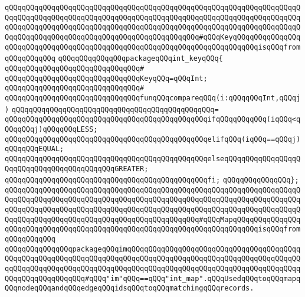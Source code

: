 \verb|qQQqqQQqqQQqqQQqqQQqqQQqqQQqqQQqqQQqqQQqqQQqqQQqqQQqqQQqqQQqqQQqqQQqqQQqqQQqqQQqqQQqqQQqqQQqqQQqqQQqqQQqqQQqqQQqqQQqqQQqqQQqqQQqqQQqqQQqqQQqqQQqqQQqqQQqqQQqqQQqqQQqqQQqqQQqqQQqqQQqqQQqqQQqqQQqqQQqqQQqqQQqqQQqqQQqqQQqqQQqqQQqqQQqqQQqqQQqqQQqqQQqqQQqqQQqqQQq#qQQqKeyqQQqqQQqqQQqqQQqqQQqqQQqqQQqqQQqqQQqqQQqqQQqqQQqqQQqqQQqqQQqqQQqqQQqqQQqqQQqisqQQqfromqQQqqQQqqQQq|\newline
\verb|qQQqqQQqqQQqqQQqpackageqQQqint_keyqQQq{|\newline
\verb|qQQqqQQqqQQqqQQqqQQqqQQqqQQqqQQq#|\newline
\verb|qQQqqQQqqQQqqQQqqQQqqQQqqQQqqQQqKeyqQQq=qQQqInt;|\newline
\verb|qQQqqQQqqQQqqQQqqQQqqQQqqQQqqQQq#|\newline
\verb|qQQqqQQqqQQqqQQqqQQqqQQqqQQqqQQqfunqQQqcompareqQQq(i:qQQqqQQqInt,qQQqj)|\newline
\verb|qQQqqQQqqQQqqQQqqQQqqQQqqQQqqQQqqQQqqQQqqQQqqQQq=|\newline
\verb|qQQqqQQqqQQqqQQqqQQqqQQqqQQqqQQqqQQqqQQqqQQqqQQqifqQQqqQQqqQQq(iqQQq<qQQqqQQqj)qQQqqQQqLESS;|\newline
\verb|qQQqqQQqqQQqqQQqqQQqqQQqqQQqqQQqqQQqqQQqqQQqqQQqelifqQQq(iqQQq==qQQqj)qQQqqQQqEQUAL;|\newline
\verb|qQQqqQQqqQQqqQQqqQQqqQQqqQQqqQQqqQQqqQQqqQQqqQQqelseqQQqqQQqqQQqqQQqqQQqqQQqqQQqqQQqqQQqqQQqqQQqGREATER;|\newline
\verb|qQQqqQQqqQQqqQQqqQQqqQQqqQQqqQQqqQQqqQQqqQQqqQQqfi;|\newline
\verb|qQQqqQQqqQQqqQQq};|\newline
\verb|qQQqqQQqqQQqqQQqqQQqqQQqqQQqqQQqqQQqqQQqqQQqqQQqqQQqqQQqqQQqqQQqqQQqqQQqqQQqqQQqqQQqqQQqqQQqqQQqqQQqqQQqqQQqqQQqqQQqqQQqqQQqqQQqqQQqqQQqqQQqqQQqqQQqqQQqqQQqqQQqqQQqqQQqqQQqqQQqqQQqqQQqqQQqqQQqqQQqqQQqqQQqqQQqqQQqqQQqqQQqqQQqqQQqqQQqqQQqqQQqqQQqqQQqqQQqqQQq#qQQqMapqQQqqQQqqQQqqQQqqQQqqQQqqQQqqQQqqQQqqQQqqQQqqQQqqQQqqQQqqQQqqQQqqQQqqQQqqQQqisqQQqfromqQQqqQQqqQQq|\newline
\newline
\verb|qQQqqQQqqQQqqQQqpackageqQQqimqQQqqQQqqQQqqQQqqQQqqQQqqQQqqQQqqQQqqQQqqQQqqQQqqQQqqQQqqQQqqQQqqQQqqQQqqQQqqQQqqQQqqQQqqQQqqQQqqQQqqQQqqQQqqQQqqQQqqQQqqQQqqQQqqQQqqQQqqQQqqQQqqQQqqQQqqQQqqQQqqQQqqQQqqQQqqQQqqQQqqQQqqQQqqQQqqQQqqQQq#qQQq"im"qQQq==qQQq"int_map".qQQqUsedqQQqtoqQQqmapqQQqnodeqQQqandqQQqedgeqQQqidsqQQqtoqQQqmatchingqQQqrecords.|\newline
